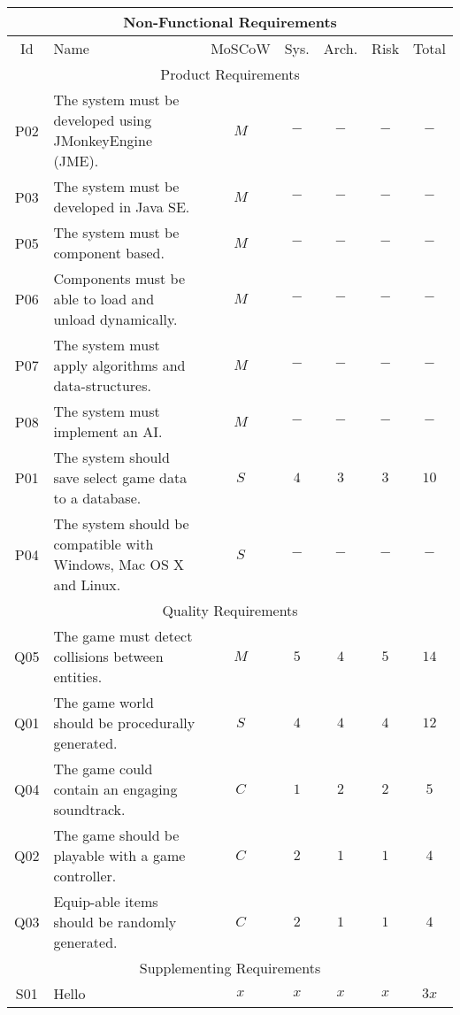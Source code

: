 \documentclass[11pt]{article}
\begin{document}
\begin{tabularx}{\textwidth}{|c|X||c||c|c|c||c|}
	\hline\multicolumn{7}{|c|}{\cellcolor{gray!50}\textbf{Non-Functional Requirements}} \\\hline
 	Id  & Name & MoSCoW & Sys. & Arch. & Risk & Total\\\hline
	\multicolumn{7}{|c|}{\cellcolor{gray!25}Product Requirements} \\\hline
 	P02 & The system must be developed using JMonkeyEngine (JME). & $M$ & $-$ & $-$ & $-$ & $-$ \\\hline
 	P03 & The system must be developed in Java SE. & $M$ & $-$ & $-$ & $-$ & $-$ \\\hline
 	P05 & The system must be component based. & $M$ & $-$ & $-$ & $-$ & $-$ \\\hline
 	P06 & Components must be able to load and unload dynamically. & $M$ &  $-$ & $-$ & $-$ & $-$ \\\hline
 	P07 & The system must apply algorithms and data-structures. & $M$ &  $-$ & $-$ & $-$ & $-$ \\\hline
 	P08 & The system must implement an AI. & $M$ &  $-$ & $-$ & $-$ & $-$ \\\hline\hline
 	P01 & The system should save select game data to a database. & $S$ & $4$ & $3$ & $3$ & $10$ \\\hline
  	P04 & The system should be compatible with Windows, Mac OS X and Linux. & $S$ & $-$ & $-$ & $-$ & $-$ \\\hline
 	
	\multicolumn{7}{|c|}{\cellcolor{gray!25}Quality Requirements} \\\hline
	
 	Q05 & The game must detect collisions between entities. & $M$ & $5$ & $4$ & $5$ & $14$ \\\hline\hline
 	Q01 & The game world should be procedurally generated. & $S$ & $4$ & $4$ & $4$ & $12$ \\\hline\hline
 	Q04 & The game could contain an engaging soundtrack. & $C$ & $1$ & $2$ & $2$ & $5$ \\\hline
 	Q02 & The game should be playable with a game controller. & $C$ & $2$ & $1$ & $1$ & $4$ \\\hline
 	Q03 & Equip-able items should be randomly generated. & $C$ & $2$ & $1$ & $1$ & $4$ \\\hline
	
	\multicolumn{7}{|c|}{\cellcolor{gray!25}Supplementing Requirements} \\\hline
 	S01 & Hello & $x$ & $x$ & $x$ & $x$ & $3x$ \\\hline
	
\end{tabularx}
\end{document}
